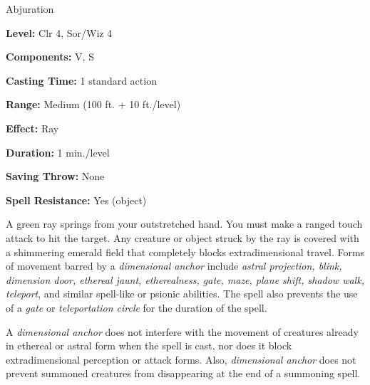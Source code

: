 
Abjuration

\textbf{Level:} Clr 4, Sor/Wiz 4

\textbf{Components:} V, S

\textbf{Casting Time:} 1 standard action

\textbf{Range:} Medium (100 ft. + 10 ft./level)

\textbf{Effect:} Ray

\textbf{Duration:} 1 min./level

\textbf{Saving Throw:} None

\textbf{Spell Resistance:} Yes (object)

A green ray springs from your outstretched hand. You must make a ranged touch attack 
to hit the target. Any creature or object struck by the ray is covered with a shimmering 
emerald field that completely blocks extradimensional travel. Forms of movement 
barred by a \textit{dimensional anchor} include \textit{astral projection, blink, 
dimension door, ethereal jaunt, etherealness, gate, maze, plane shift, shadow walk, 
teleport}, and similar spell-like or psionic abilities. The spell also prevents 
the use of a \textit{gate} or \textit{teleportation circle} for the duration of 
the spell.

A \textit{dimensional anchor} does not interfere with the movement of creatures 
already in ethereal or astral form when the spell is cast, nor does it block extradimensional 
perception or attack forms. Also, \textit{dimensional anchor} does not prevent 
summoned creatures from disappearing at the end of a summoning spell.

